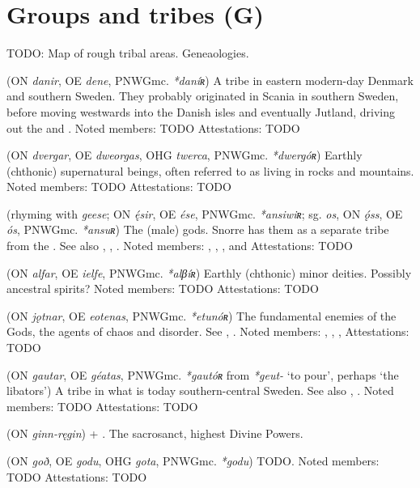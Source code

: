 \section{Groups and tribes (G)}
TODO: Map of rough tribal areas. Geneaologies.

\begin{itemize}

 (ON \emph{danir}, OE \emph{dene}, PNWGmc. \emph{*daníʀ})
  A tribe in eastern modern-day Denmark and southern Sweden. They probably originated in Scania in southern Sweden, before moving westwards into the Danish isles and eventually Jutland, driving out the  and .
  Noted members: TODO
  Attestations: TODO

 (ON \emph{dvergar}, OE \emph{dweorgas}, OHG \emph{twerca}, PNWGmc. \emph{*dwergóʀ})
  Earthly (chthonic) supernatural beings, often referred to as living in rocks and mountains.
  Noted members: TODO
  Attestations: TODO

 (rhyming with \emph{geese}; ON \emph{ę́sir}, OE \emph{ése}, PNWGmc. \emph{*ansiwiʀ}; sg. \emph{os}, ON \emph{ǫ́ss}, OE \emph{ós}, PNWGmc. \emph{*ansuʀ})
  The (male) gods. Snorre has them as a separate tribe from the . See also , , .
  Noted members: , , ,  and 
  Attestations: TODO

 (ON \emph{alfar}, OE \emph{ielfe}, PNWGmc. \emph{*alβíʀ})
  Earthly (chthonic) minor deities. Possibly ancestral spirits?
  Noted members: TODO
  Attestations: TODO

 (ON \emph{jǫtnar}, OE \emph{eotenas}, PNWGmc. \emph{*etunóʀ})
  The fundamental enemies of the Gods, the agents of chaos and disorder. See , .
  Noted members: , , , 
  Attestations: TODO

 (ON \emph{gautar}, OE \emph{géatas}, PNWGmc. \emph{*gautóʀ} from \emph{*geut-} ‘to pour’, perhaps ‘the libators’)
  A tribe in what is today southern-central Sweden. See also , .
  Noted members: TODO
  Attestations: TODO

 (ON \emph{ginn-ręgin})
   + . The sacrosanct, highest Divine Powers.

 (ON \emph{goð}, OE \emph{godu}, OHG \emph{gota}, PNWGmc. \emph{*godu})
  TODO.
  Noted members: TODO
  Attestations: TODO


\end{itemize}
